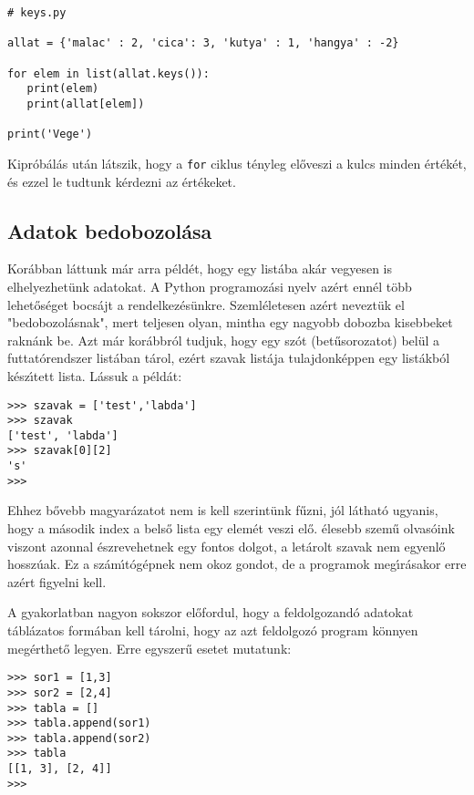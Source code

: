 \begin{Verbatim}[fontsize=\small]
# keys.py

allat = {'malac' : 2, 'cica': 3, 'kutya' : 1, 'hangya' : -2}

for elem in list(allat.keys()):
   print(elem)
   print(allat[elem])

print('Vege')   
\end{Verbatim}

Kipr\'ob\'al\'as ut\'an l\'atszik, hogy a {\tt for} ciklus t\'enyleg el\H{o}veszi a kulcs minden \'ert\'ek\'et, \'es ezzel 
le tudtunk k\'erdezni az \'ert\'ekeket.

\subsection{Adatok bedobozol\'asa}

Kor\'abban l\'attunk m\'ar arra p\'eld\'et, hogy egy list\'aba ak\'ar vegyesen is elhelyezhet\"unk  adatokat. A Python 
programoz\'asi nyelv az\'ert enn\'el t\"obb lehet\H{o}s\'eget bocs\'ajt a rendelkez\'es\"unkre. Szeml\'eletesen az\'ert 
nevezt\"uk el "bedobozol\'asnak", mert teljesen olyan, mintha egy nagyobb dobozba kisebbeket rakn\'ank be. Azt m\'ar 
kor\'abbr\'ol tudjuk, hogy egy sz\'ot (bet\H{u}sorozatot) bel\"ul a futtat\'orendszer list\'aban t\'arol, ez\'ert 
szavak list\'aja tulajdonk\'eppen egy list\'akb\'ol k\'esz\'{\i}tett lista. L\'assuk a p\'eld\'at:

\begin{Verbatim}[fontsize=\small]
>>> szavak = ['test','labda']
>>> szavak
['test', 'labda']
>>> szavak[0][2]
's'
>>> 
\end{Verbatim}

Ehhez b\H{o}vebb magyar\'azatot nem is kell szerint\"unk f\H{u}zni, j\'ol l\'athat\'o ugyanis, hogy a m\'asodik index 
a bels\H{o} lista egy elem\'et veszi el\H{o}. \'elesebb szem\H{u} olvas\'oink viszont azonnal \'eszrevehetnek egy 
fontos dolgot, a let\'arolt szavak nem egyenl\H{o} hossz\'uak. Ez a sz\'am\'{\i}t\'og\'epnek nem okoz gondot, de a 
programok meg\'{\i}r\'asakor erre az\'ert figyelni kell. 

A gyakorlatban nagyon sokszor el\H{o}fordul, hogy a feldolgozand\'o adatokat t\'abl\'azatos form\'aban kell 
t\'arolni, hogy az azt feldolgoz\'o program k\"onnyen meg\'erthet\H{o} legyen. Erre egyszer\H{u} esetet mutatunk:

\begin{Verbatim}[fontsize=\small]
>>> sor1 = [1,3]
>>> sor2 = [2,4]
>>> tabla = []
>>> tabla.append(sor1)
>>> tabla.append(sor2)
>>> tabla 
[[1, 3], [2, 4]]
>>>
\end{Verbatim}

